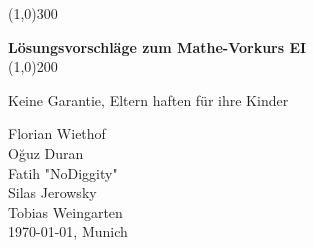 \begin{titlepage}
	\vspace*{\fill}
	\begin{center}
		\color{gray}\line(1,0){300} \\
		\color{black}
		\vspace{1cm}

		\huge{\bfseries Lösungsvorschläge zum Mathe-Vorkurs EI} \\
		[0.15in]
		\color{gray}\line(1,0){200} \\
		\color{black}

		\vspace{0.5cm}
		\begin{minipage}{8cm}
			\begin{center}
				\large{Keine Garantie, Eltern haften für ihre Kinder}
			\end{center}
		\end{minipage}	
	\end{center}
	\vspace*{\fill}
	\vspace{4cm}
	
	\begin{flushright}
		Florian Wiethof \\
		O\u{g}uz Duran \\
		Fatih "NoDiggity" \\
		Silas Jerowsky \\
		Tobias Weingarten \\
		\today, Munich
	\end{flushright}
\end{titlepage}



\tableofcontents
{}
\thispagestyle{empty}
\clearpage
\setcounter{page}{1}

